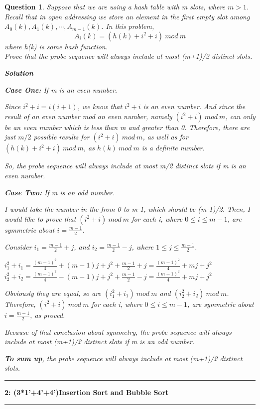 \documentclass{article}
\newcommand\question[2]{\vspace{.25in}\hrule\textbf{#1: #2}\vspace{.5em}\hrule\vspace{.10in}}
\newtheorem{Q}{Question}
\begin{document}
\begin{Q}
	Suppose that we are using a hash table with m slots, where $m>1$. Recall that in open addressing we store an element in the first empty slot among $A_0(k),A_1(k),\cdots,A_{m-1}(k)$. In this problem,
	$$A_i(k)=(h(k)+i^2+i)~mod~m$$
	where h(k) is some hash function.\\
	Prove that the probe sequence will always include at most (m+1)/2 distinct slots.

	\textbf{Solution}

	\textbf{Case One:} If m is an even number.

	Since $i^2+i=i(i+1)$, we know that $i^2+i$ is an even number. And since the result of an even number mod an even number, namely $(i^2+i)~mod~m$,
	can only be an even number which is less than m and greater than 0. Therefore, there are just $m/2$ possible results for $(i^2+i)~mod~m$, as well as for $(h(k)+i^2+i)~mod~m$, as $h(k)~mod~m$ is a definite number.

	So, the probe sequence will always include at most m/2 distinct slots if m is an even number.

	\textbf{Case Two:} If m is an odd number.

	I would take the number in the from 0 to m-1, which should be (m-1)/2. Then, I would like to prove that $(i^2+i)~mod~m$ for each i, where $0\leq i\leq m-1$, are symmetric about $i=\frac{m-1}{2}$.

	Consider $i_1=\frac{m-1}{2}+j$, and $i_2=\frac{m-1}{2}-j$, where $1\leq j\leq \frac{m-1}{2}$.

	$i_1^2+i_1=\frac{(m-1)^2}{4}+(m-1)j+j^2+\frac{m-1}{2}+j=\frac{(m-1)^2}{4}+mj+j^2$\\
	$i_2^2+i_2=\frac{(m-1)^2}{4}-(m-1)j+j^2+\frac{m-1}{2}-j=\frac{(m-1)^2}{4}+mj+j^2$

	Obviously they are equal, so are $(i_1^2+i_1)~mod~m$ and $(i_2^2+i_2)~mod~m$.\\
	Therefore, $(i^2+i)~mod~m$ for each i, where $0\leq i\leq m-1$, are symmetric about $i=\frac{m-1}{2}$, as proved.

	Because of that conclusion about symmetry, the probe sequence will always include at most (m+1)/2 distinct slots if m is an odd number.
	
	\medskip
	\textbf{To sum up}, the probe sequence will always include at most (m+1)/2 distinct slots.


\end{Q}

\pagebreak
\question{2}{(3*1'+4'+4')Insertion Sort and Bubble Sort}
\end{document}
